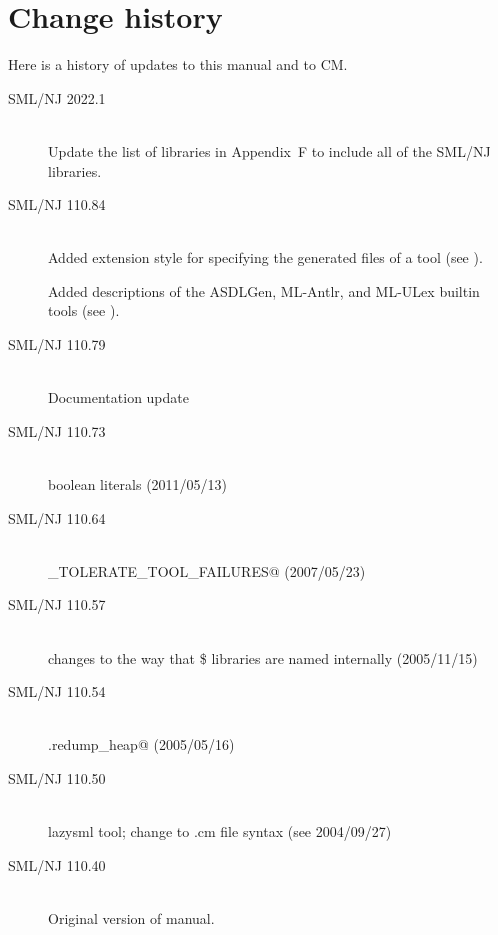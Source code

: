 %
\chapter{Change history}
\label{app:changes}

Here is a history of updates to this manual and to CM.
\begin{description}
  \item[SML/NJ 2022.1]
    \mbox{}\\[0.5em]
    Update the list of libraries in Appendix~F to include all of the SML/NJ libraries.

  \item[SML/NJ 110.84]
    \mbox{}\\[0.5em]
    Added \lstinline@RENAME@ extension style for specifying the
    generated files of a tool (see ).

    Added descriptions of the ASDLGen, ML-Antlr, and ML-ULex builtin tools
    (see ).

  \item[SML/NJ 110.79]
    \mbox{}\\[0.5em]
    Documentation update

  \item[SML/NJ 110.73]
    \mbox{}\\[0.5em]
    boolean literals (2011/05/13)

  \item[SML/NJ 110.64]
    \mbox{}\\[0.5em]
     \lstinline@CM_TOLERATE_TOOL_FAILURES@ (2007/05/23)

  \item[SML/NJ 110.57]
    \mbox{}\\[0.5em]
    changes to the way that \$ libraries are named internally (2005/11/15)

  \item[SML/NJ 110.54]
    \mbox{}\\[0.5em]
    \lstinline@CM.redump_heap@ (2005/05/16)

  \item[SML/NJ 110.50]
    \mbox{}\\[0.5em]
    lazysml tool; change to .cm file syntax (see 2004/09/27)

  \item[SML/NJ 110.40]
    \mbox{}\\[0.5em]
    Original version of manual.
\end{description}%
